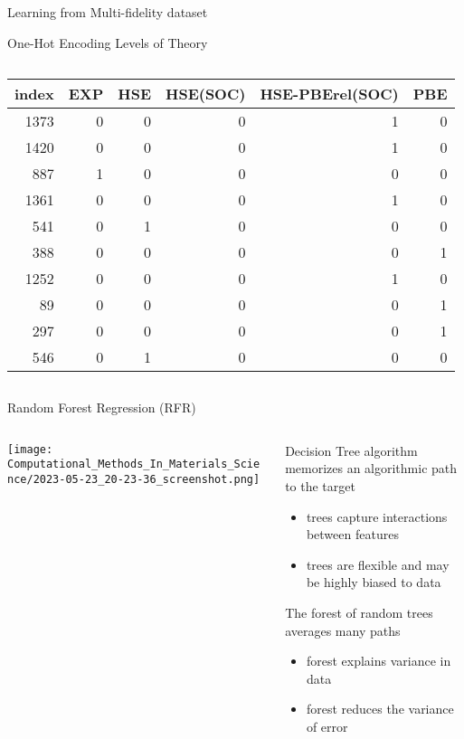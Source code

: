 \documentclass[10pt, aspectratio=169, presentation]{beamer}
\begin{document}
\begin{frame}[label={sec:org4baaeb2}]{Learning from Multi-fidelity dataset}
\begin{block}{One-Hot Encoding Levels of Theory}
\begin{columns}
\begin{column}{0.7\columnwidth}
\scriptsize
\begin{center}
\begin{tabular}{rrrrrr}
index & EXP & HSE & HSE(SOC) & HSE-PBErel(SOC) & PBE\\[0pt]
\hline
1373 & 0 & 0 & 0 & 1 & 0\\[0pt]
1420 & 0 & 0 & 0 & 1 & 0\\[0pt]
887 & 1 & 0 & 0 & 0 & 0\\[0pt]
1361 & 0 & 0 & 0 & 1 & 0\\[0pt]
541 & 0 & 1 & 0 & 0 & 0\\[0pt]
388 & 0 & 0 & 0 & 0 & 1\\[0pt]
1252 & 0 & 0 & 0 & 1 & 0\\[0pt]
89 & 0 & 0 & 0 & 0 & 1\\[0pt]
297 & 0 & 0 & 0 & 0 & 1\\[0pt]
546 & 0 & 1 & 0 & 0 & 0\\[0pt]
\end{tabular}
\end{center}
\end{column}
\end{columns}
\end{block}
\end{frame}

\begin{frame}[label={sec:org8dceefc}]{Random Forest Regression (RFR)}
\begin{columns}
\begin{column}{0.6\columnwidth}
\begin{center}
\texttt{[image: Computational\_Methods\_In\_Materials\_Science/2023-05-23\_20-23-36\_screenshot.png]}
\end{center}
\end{column}

\begin{column}{0.4\columnwidth}
Decision Tree algorithm memorizes an algorithmic path to the target
\begin{itemize}
\item trees capture interactions between features
\item trees are flexible and may be highly biased to data
\end{itemize}
The forest of random trees averages many paths
\begin{itemize}
\item forest explains variance in data
\item forest reduces the variance of error
\end{itemize}
\end{column}
\end{columns}
\end{frame}
\end{document}
